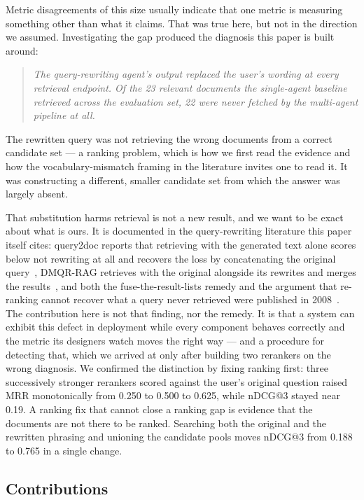 \documentclass[acmsmall,review,anonymous,screen]{acmart}
\begin{document}
Metric disagreements of this size usually indicate that one metric is measuring
something other than what it claims. That was true here, but not in the
direction we assumed. Investigating the gap produced the diagnosis this paper is
built around:

\begin{quote}
\emph{The query-rewriting agent's output replaced the user's wording at every
retrieval endpoint. Of the 23 relevant documents the single-agent baseline
retrieved across the evaluation set, 22 were never fetched by the multi-agent
pipeline at all.}
\end{quote}

The rewritten query was not retrieving the wrong documents from a correct
candidate set --- a ranking problem, which is how we first read the evidence and
how the vocabulary-mismatch framing in the literature invites one to read it.
It was constructing a different, smaller candidate set from which the answer was
largely absent.

That substitution harms retrieval is not a new result, and we want to be exact
about what is ours. It is documented in the query-rewriting literature this
paper itself cites: query2doc reports that retrieving with the generated text
alone scores below not rewriting at all and recovers the loss by concatenating
the original query~\cite{wang2023query2doc}, DMQR-RAG retrieves with the original
alongside its rewrites and merges the results~\cite{gao2024dmqr}, and both the
fuse-the-result-lists remedy and the argument that re-ranking cannot recover what
a query never retrieved were published in 2008~\cite{zighelnic2008drift}. The
contribution here is not that finding, nor the remedy. It is that a system can
exhibit this defect in deployment while every component behaves correctly and the
metric its designers watch moves the right way --- and a procedure for detecting
that, which we arrived at only after building two rerankers on the wrong
diagnosis. We confirmed the distinction by fixing ranking first: three
successively stronger rerankers scored against the user's original question
raised MRR monotonically from 0.250 to 0.500 to 0.625, while nDCG@3 stayed near
0.19. A ranking fix that cannot close a ranking gap is evidence that the
documents are not there to be ranked. Searching both the original and the
rewritten phrasing and unioning the candidate pools moves nDCG@3 from 0.188 to
0.765 in a single change.

\subsection{Contributions}
\end{document}
